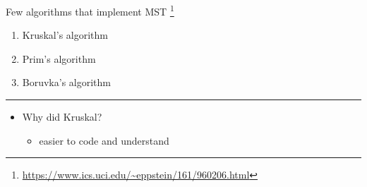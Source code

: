 \documentclass[presentation]{beamer}
\begin{document}
\begin{frame}[label={sec:orgheadline3}]{Few algorithms that implement MST \footnote{\url{https://www.ics.uci.edu/~eppstein/161/960206.html}}}
\begin{enumerate}
\item Kruskal's algorithm
\item Prim's algorithm
\item Boruvka's algorithm
\end{enumerate}

\rule{\linewidth}{0.5pt}
\begin{itemize}
\item Why did Kruskal?
\begin{itemize}
\item easier to code and understand
\end{itemize}
\end{itemize}
\end{frame}
\end{document}
